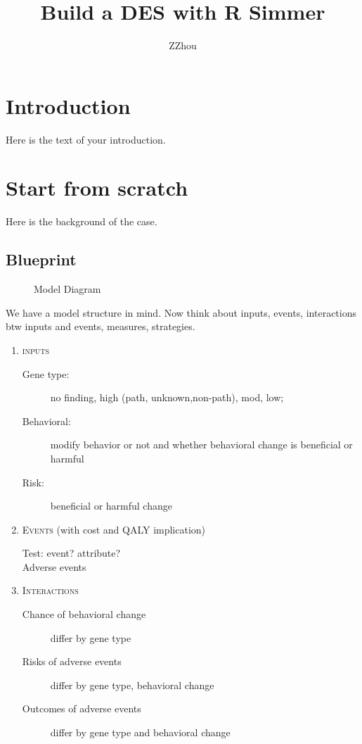 \documentclass{article}
\begin{document}
\title{Build a DES with R Simmer}
\author{ZZhou}

\maketitle

\section{Introduction}
Here is the text of your introduction.
\pagebreak

\section{Start from scratch}
Here is the background of the case.
\pagebreak

\subsection{Blueprint}
\begin{figure}
\centering
  \caption{Model Diagram}
  \label{simulationfigure}
\end{figure}


We have a model structure in mind. Now think about inputs, events, interactions btw inputs and events, measures, strategies. 

\begin{enumerate}

\item
\textsc{inputs} 
\begin{description} 
\item[Gene type:] no finding, high (path, unknown,non-path), mod, low;
\item[Behavioral:] modify behavior or not and whether behavioral change is beneficial or harmful
\item[Risk:] beneficial or harmful change
\end{description}

\item
\textsc{Events} (with cost and QALY implication)  
\begin{description} 
\item[Test: event? attribute?]
\item[Adverse events]
\end{description}

\item
\textsc{Interactions}
\begin{description} 
\item[Chance of behavioral change] differ by gene type
\item[Risks of adverse events] differ by gene type, behavioral change
\item[Outcomes of adverse events] differ by gene type and behavioral change
\end{description}

\end{enumerate}
\pagebreak
\end{document}
